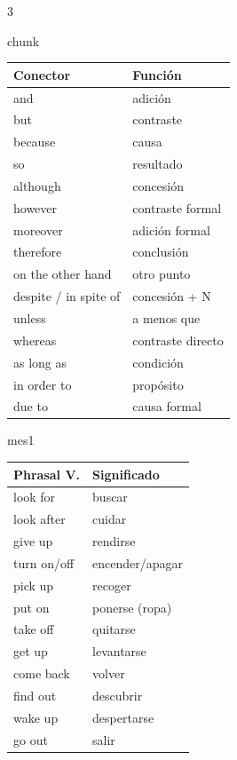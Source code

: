 \documentclass[10pt,a4paper,landscape]{article}
\begin{document}
\begin{multicols}{3}
\begin{cajaseccion}{chunk}
{\scriptsize
\begin{tabularx}{\linewidth}{@{} l l @{}}
\toprule
\textbf{Conector} & \textbf{Función} \\
\midrule
and & adición \\
but & contraste \\
because & causa \\
so & resultado \\
although & concesión \\
however & contraste formal \\
moreover & adición formal \\
therefore & conclusión \\
on the other hand & otro punto \\
despite / in spite of & concesión + N \\
unless & a menos que \\
whereas & contraste directo \\
as long as & condición \\
in order to & propósito \\
due to & causa formal \\
\bottomrule
\end{tabularx}
}
\end{cajaseccion}

\columnbreak

\begin{cajaseccion}{mes1}
{\scriptsize
\begin{tabularx}{\linewidth}{@{} l l @{}}
\toprule
\textbf{Phrasal V.} & \textbf{Significado} \\
\midrule
look for & buscar \\
look after & cuidar \\
give up & rendirse \\
turn on/off & encender/apagar \\
pick up & recoger \\
put on & ponerse (ropa) \\
take off & quitarse \\
get up & levantarse \\
come back & volver \\
find out & descubrir \\
wake up & despertarse \\
go out & salir \\
\bottomrule
\end{tabularx}
}
\end{cajaseccion}


\end{multicols}
\end{document}
